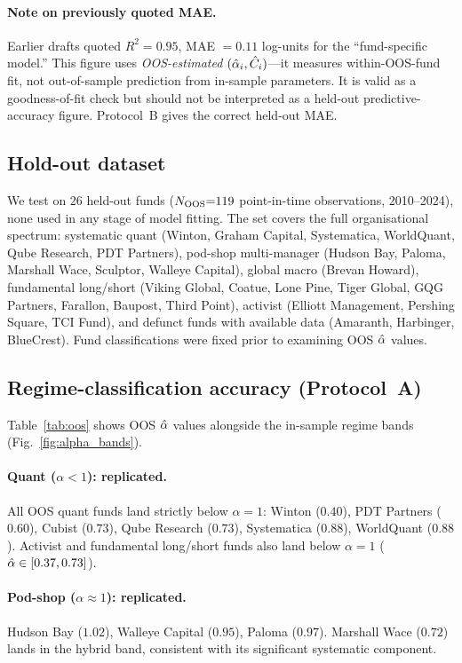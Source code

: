 \paragraph{Note on previously quoted MAE.}
Earlier drafts quoted $R^2 = 0.95$, MAE $= 0.11$ log-units for
the ``fund-specific model.''
This figure uses \emph{OOS-estimated} $(\hat{\alpha}_i, \hat{C}_i)$---it
measures within-OOS-fund fit, not out-of-sample prediction from
in-sample parameters.
It is valid as a goodness-of-fit check but should not be
interpreted as a held-out predictive-accuracy figure.
Protocol~B gives the correct held-out MAE.

\subsection{Hold-out dataset}

We test on 26 held-out funds ($N_{\rm OOS}{=}119$ point-in-time
observations, 2010--2024), none used in any stage of model fitting.
The set covers the full organisational spectrum:
systematic quant (Winton, Graham Capital, Systematica,
WorldQuant, Qube Research, PDT Partners),
pod-shop multi-manager (Hudson Bay, Paloma, Marshall Wace,
Sculptor, Walleye Capital),
global macro (Brevan Howard),
fundamental long/short (Viking Global, Coatue, Lone Pine,
Tiger Global, GQG Partners, Farallon, Baupost, Third Point),
activist (Elliott Management, Pershing Square, TCI Fund),
and defunct funds with available data (Amaranth, Harbinger,
BlueCrest).
Fund classifications were fixed prior to examining OOS $\hat{\alpha}$ values.

\subsection{Regime-classification accuracy (Protocol~A)}

Table~\ref{tab:oos} shows OOS $\hat{\alpha}$ values alongside the
in-sample regime bands (Fig.~\ref{fig:alpha_bands}).

\paragraph{Quant ($\alpha < 1$): replicated.}
All OOS quant funds land strictly below $\alpha = 1$:
Winton ($0.40$), PDT Partners ($0.60$),
Cubist ($0.73$), Qube Research ($0.73$),
Systematica ($0.88$), WorldQuant ($0.88$).
Activist and fundamental long/short funds also land below
$\alpha = 1$ ($\hat{\alpha} \in [0.37, 0.73]$).

\paragraph{Pod-shop ($\alpha \approx 1$): replicated.}
Hudson Bay ($1.02$), Walleye Capital ($0.95$), Paloma ($0.97$).
Marshall Wace ($0.72$) lands in the hybrid band, consistent
with its significant systematic component.

